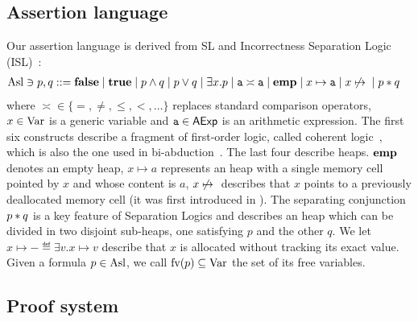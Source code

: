 \subsection{Assertion language}
Our assertion language is derived from SL and Incorrectness Separation Logic (ISL)~\cite{RBDDOV20}:
\begin{align*}
	\text{Asl} \ni p, q ::= & \; \textbf{false} \mid \textbf{true} \mid p \land q \mid p \lor q \mid \exists x . p \mid \texttt{a} \asymp \texttt{a} \mid \textbf{emp} \mid x \mapsto \texttt{a} \mid x \not\mapsto{} \mid p * q
\end{align*}
where $\asymp \in \{ =, \neq, \le, <, \dots \}$ replaces standard comparison operators, $x \in \text{Var}$ is a generic variable and $\texttt{a} \in \mathsf{AExp}$ is an arithmetic expression. The first six constructs describe a fragment of first-order logic, called coherent logic~\cite{BC05}, which is also the one used in bi-abduction~\cite{CDOY09}. The last four describe heaps.
$\textbf{emp}$ denotes an empty heap, $x \mapsto a$ represents an heap with a single memory cell pointed by $x$ and whose content is $a$, $x \not\mapsto{}$ describes that $x$ points to a previously deallocated memory cell (it was first introduced in \cite{RBDDOV20}).
The separating conjunction $p * q$ is a key feature of Separation Logics and describes an heap which can be divided in two disjoint sub-heaps, one satisfying $p$ and the other $q$.
We let $x \mapsto - \eqdef \exists v. x \mapsto v$ describe that $x$ is allocated without tracking its exact value.
Given a formula $p \in \text{Asl}$, we call $\text{fv}(p) \subseteq \text{Var}$ the set of its free variables.

\subsection{Proof system}\label{sec:sil:sepsil-proof-system}

